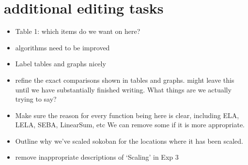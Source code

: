  
 
\section*{additional editing tasks}
\begin{itemize}
    \item Table 1: which items do we want on here?
    \item algorithms need to be improved
    \item Label tables and graphs nicely
    \item refine the exact comparisons shown in tables and graphs. might leave this until we have substantially finished writing. What things are we actually trying to say?
    \item Make sure the reason for every function being here is clear, including ELA, LELA, SEBA, LinearSum, etc We can remove some if it is more appropriate.
    \item Outline why we've scaled sokoban for the locations where it has been scaled.
    \item remove inappropriate descriptions of `Scaling' in Exp 3
\end{itemize}
 